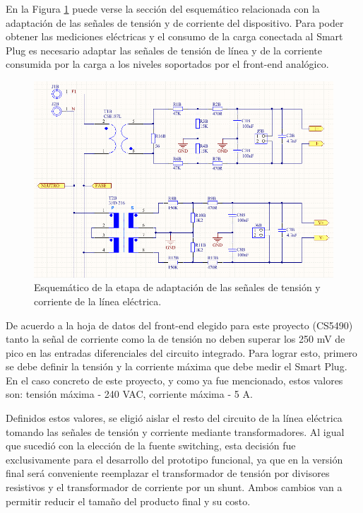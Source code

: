 En la Figura \ref{fig:pcb_adaptacion} puede verse la sección del esquemático relacionada con la adaptación de las señales de tensión y de corriente del dispositivo. Para poder obtener las mediciones eléctricas y el consumo de la carga conectada al Smart Plug es necesario adaptar las señales de tensión de línea y de la corriente consumida por la carga a los niveles soportados por el front-end analógico.

\begin{figure}[h]
	\centering
	\includegraphics[width=14cm]{./Figures/3_1_2_pcb_adaptacion.png}
	\caption{Esquemático de la etapa de adaptación de las señales de tensión y corriente de la línea eléctrica.}
	\label{fig:pcb_adaptacion}
\end{figure}

De acuerdo a la hoja de datos del front-end elegido para este proyecto (CS5490) tanto la señal de corriente como la de tensión no deben superar los 250 mV de pico en las entradas diferenciales del circuito integrado. Para lograr esto, primero se debe definir la tensión y la corriente máxima que debe medir el Smart Plug. En el caso concreto de este proyecto, y como ya fue mencionado, estos valores son: tensión máxima - 240 VAC, corriente máxima - 5 A.

Definidos estos valores, se eligió aislar el resto del circuito de la línea eléctrica tomando las señales de tensión y corriente mediante transformadores. Al igual que sucedió con la elección de la fuente switching, esta decisión fue exclusivamente para el desarrollo del prototipo funcional, ya que en la versión final será conveniente reemplazar el transformador de tensión por divisores resistivos y el transformador de corriente por un shunt. Ambos cambios van a permitir reducir el tamaño del producto final y su costo.

